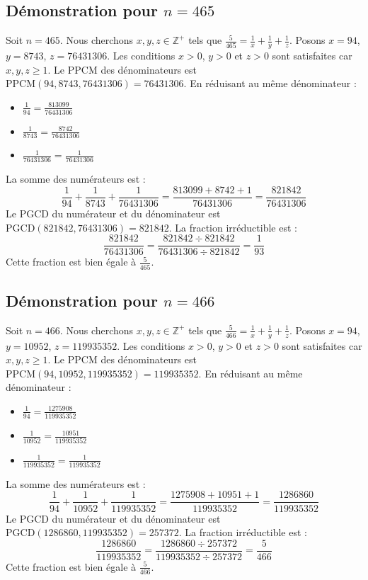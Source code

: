 \documentclass[11pt,a4paper]{article}
\begin{document}
\subsection{Démonstration pour $n = 465$}
Soit $n = 465$. Nous cherchons $x, y, z \in \mathbb{Z}^{+}$ tels que $\frac{5}{465} = \frac{1}{x} + \frac{1}{y} + \frac{1}{z}$.
Posons $x = 94$, $y = 8743$, $z = 76431306$.
Les conditions $x > 0$, $y > 0$ et $z > 0$ sont satisfaites car $x, y, z \geq 1$.
Le PPCM des dénominateurs est $\text{PPCM}(94, 8743, 76431306) = 76431306$.
En réduisant au même dénominateur :
\begin{itemize}
    \item $\frac{1}{94} = \frac{813099}{76431306}$
    \item $\frac{1}{8743} = \frac{8742}{76431306}$
    \item $\frac{1}{76431306} = \frac{1}{76431306}$
\end{itemize}
La somme des numérateurs est :
$$ \frac{1}{94} + \frac{1}{8743} + \frac{1}{76431306} = \frac{813099 + 8742 + 1}{76431306} = \frac{821842}{76431306} $$
Le PGCD du numérateur et du dénominateur est $\text{PGCD}(821842, 76431306) = 821842$.
La fraction irréductible est :
$$ \frac{821842}{76431306} = \frac{821842 \div 821842}{76431306 \div 821842} = \frac{1}{93} $$
Cette fraction est bien égale à $\frac{5}{465}$.

\subsection{Démonstration pour $n = 466$}
Soit $n = 466$. Nous cherchons $x, y, z \in \mathbb{Z}^{+}$ tels que $\frac{5}{466} = \frac{1}{x} + \frac{1}{y} + \frac{1}{z}$.
Posons $x = 94$, $y = 10952$, $z = 119935352$.
Les conditions $x > 0$, $y > 0$ et $z > 0$ sont satisfaites car $x, y, z \geq 1$.
Le PPCM des dénominateurs est $\text{PPCM}(94, 10952, 119935352) = 119935352$.
En réduisant au même dénominateur :
\begin{itemize}
    \item $\frac{1}{94} = \frac{1275908}{119935352}$
    \item $\frac{1}{10952} = \frac{10951}{119935352}$
    \item $\frac{1}{119935352} = \frac{1}{119935352}$
\end{itemize}
La somme des numérateurs est :
$$ \frac{1}{94} + \frac{1}{10952} + \frac{1}{119935352} = \frac{1275908 + 10951 + 1}{119935352} = \frac{1286860}{119935352} $$
Le PGCD du numérateur et du dénominateur est $\text{PGCD}(1286860, 119935352) = 257372$.
La fraction irréductible est :
$$ \frac{1286860}{119935352} = \frac{1286860 \div 257372}{119935352 \div 257372} = \frac{5}{466} $$
Cette fraction est bien égale à $\frac{5}{466}$.
\end{document}
